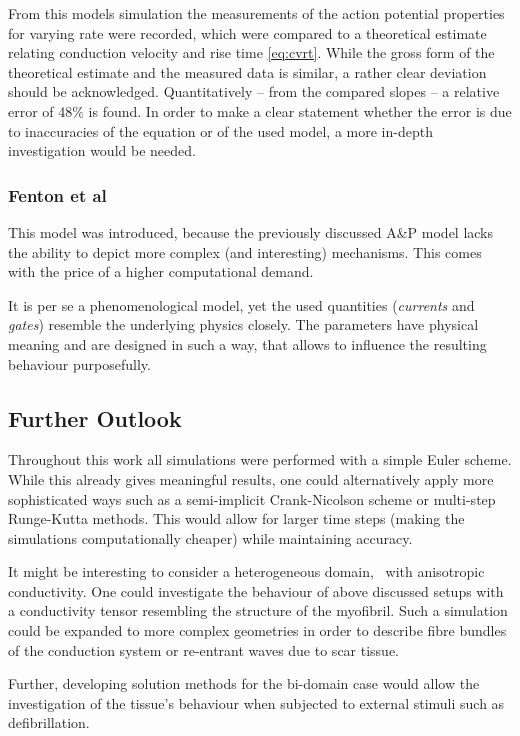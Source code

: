 From this models simulation the measurements of the action potential properties
for varying rate were recorded, which were compared to a theoretical estimate
relating conduction velocity and rise time \eqref{eq:cvrt}.
While the gross form of the theoretical estimate and the measured data is
similar, a rather clear deviation should be acknowledged. Quantitatively
-- from the compared slopes -- a relative error of 48\% is found. In order to
make a clear statement whether the error is due to inaccuracies of the equation
or of the used model, a more in-depth investigation would be needed.

\subsubsection{Fenton et al}
This model was introduced, because the previously discussed A\&P model lacks
the ability to depict more complex (and interesting) mechanisms. This comes
with the price of a higher computational demand.

It is per se a phenomenological model, yet the used quantities (\emph{currents}
and \emph{gates}) resemble the underlying physics closely. The parameters have
physical meaning and are designed in such a way, that allows to influence the
resulting behaviour purposefully.

\subsection{Further Outlook}
Throughout this work all simulations were performed with a simple Euler scheme.
While this already gives meaningful results, one could alternatively apply more
sophisticated ways such as a semi-implicit Crank-Nicolson scheme or
multi-step Runge-Kutta methods. This would allow for larger time steps (making
the simulations computationally cheaper) while maintaining accuracy.

It might be interesting to consider a heterogeneous domain, \ie~with
anisotropic conductivity. One could investigate the behaviour of above
discussed setups with a conductivity tensor resembling the structure of the
myofibril. Such a simulation could be expanded to more complex geometries in
order to describe fibre bundles of the conduction system or re-entrant waves
due to scar tissue.

Further, developing solution methods for the bi-domain case would allow the
investigation of the tissue's behaviour when subjected to external stimuli such
as defibrillation.


